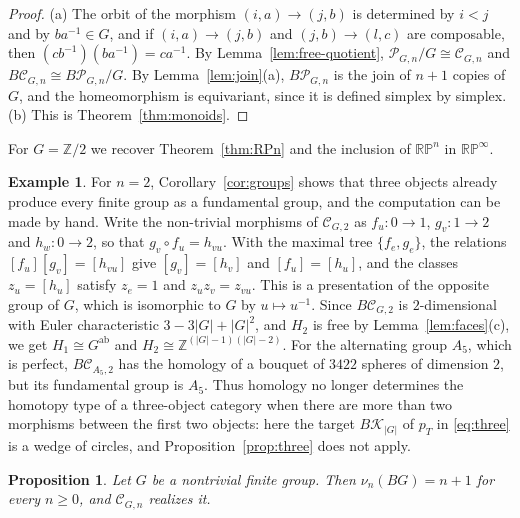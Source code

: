 \documentclass[12pt]{amsart}
\newtheorem{proposition}[teo]{Proposition}
\theoremstyle{definition}
\newtheorem{example}[teo]{Example}
\theoremstyle{remark}
\newcommand{\CC}{\mathcal{C}}
\newcommand{\PP}{\mathcal{P}}
\newcommand{\co}{\colon}
\newcommand{\Z}{\mathbb{Z}}
\newcommand{\K}{\mathcal{K}}
\newcommand{\RP}{\mathbb{RP}}
\begin{document}
\begin{proof}
(a) The orbit of the morphism $(i,a)\to(j,b)$ is determined by $i<j$ and by $ba^{-1}\in G$, and if $(i,a)\to(j,b)$ and $(j,b)\to(l,c)$ are composable, then $(cb^{-1})(ba^{-1})=ca^{-1}$. By Lemma~\ref{lem:free-quotient}, $\PP_{G,n}/G\cong\CC_{G,n}$ and $B\CC_{G,n}\cong B\PP_{G,n}/G$. By Lemma~\ref{lem:join}(a), $B\PP_{G,n}$ is the join of $n+1$ copies of $G$, and the homeomorphism is equivariant, since it is defined simplex by simplex. (b) This is Theorem~\ref{thm:monoids}.
\end{proof}

For $G=\Z/2$ we recover Theorem~\ref{thm:RPn} and the inclusion of $\RP^n$ in $\RP^\infty$.

\begin{example}\label{ex:perfect}
For $n=2$, Corollary~\ref{cor:groups} shows that three objects already produce every finite group as a fundamental group, and the computation can be made by hand. Write the non-trivial morphisms of $\CC_{G,2}$ as $f_u\co0\to1$, $g_v\co1\to2$ and $h_w\co0\to2$, so that $g_v\circ f_u=h_{vu}$. With the maximal tree $\{f_e,g_e\}$, the relations $[f_u][g_v]=[h_{vu}]$ give $[g_v]=[h_v]$ and $[f_u]=[h_u]$, and the classes $z_u=[h_u]$ satisfy $z_e=1$ and $z_uz_v=z_{vu}$. This is a presentation of the opposite group of $G$, which is isomorphic to $G$ by $u\mapsto u^{-1}$. Since $B\CC_{G,2}$ is $2$-dimensional with Euler characteristic $3-3|G|+|G|^2$, and $H_2$ is free by Lemma~\ref{lem:faces}(c), we get $H_1\cong G^{\mathrm{ab}}$ and $H_2\cong\Z^{(|G|-1)(|G|-2)}$. For the alternating group $A_5$, which is perfect, $B\CC_{A_5,2}$ has the homology of a bouquet of $3422$ spheres of dimension $2$, but its fundamental group is $A_5$. Thus homology no longer determines the homotopy type of a three-object category when there are more than two morphisms between the first two objects: here the target $B\K_{|G|}$ of $p_T$ in \eqref{eq:three} is a wedge of circles, and Proposition~\ref{prop:three} does not apply.
\end{example}

\begin{proposition}\label{prop:groups-minimal}
Let $G$ be a nontrivial finite group. Then $\nu_n(BG)=n+1$ for every $n\ge0$, and $\CC_{G,n}$ realizes it.
\end{proposition}
\end{document}
